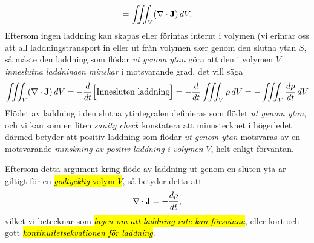 {{{$$   =\iiint_V (\nabla\cdot{\bf J})\,dV.
$$}
Eftersom ingen laddning kan skapas eller f{\"o}rintas internt i volymen (vi
erinrar oss att all laddnings\-transport in eller ut fr{\aa}n volymen sker
genom den slutna ytan $S$, s{\aa} m{\aa}ste den laddning som fl{\"o}dar
{\it ut genom ytan} g{\"o}ra att den i volymen $V$ {\it inneslutna laddningen
minskar} i motsvarande grad, det vill s{\"a}ga
\hl{$$
  \iiint_V (\nabla\cdot{\bf J})\,dV
    =-{{d}\over{dt}}\Big[\hbox{Innesluten laddning}\Big]
    =-{{d}\over{dt}}\iiint_V \rho\,dV
    =-\iiint_V {{d\rho}\over{dt}}\,dV
$$}
Fl{\"o}det av laddning i den slutna ytintegralen definieras som fl{\"o}det
{\it ut genom ytan}, och vi kan som en liten {\it sanity check} konstatera att
minustecknet i h{\"o}gerledet d{\"a}rmed betyder att positiv laddning som
fl{\"o}dar {\it ut genom ytan} motsvaras av en motsvarande {\it minskning av
positiv laddning i volymen} $V$, helt enligt f{\"o}rv{\"a}ntan.

Eftersom detta argument kring fl{\"o}de av laddning ut genom en sluten yta
{\"a}r giltigt f{\"o}r en {\hl{{\it godtycklig} volym $V$}}, s{\aa} betyder
detta att
\hl{$$
  \nabla\cdot{\bf J}=-{{d\rho}\over{dt}},
$$}
vilket vi betecknar
som {\hl{\it lagen om att laddning inte kan f{\"o}rsvinna}}, eller kort och
gott {\hl{\it kontinuitetsekvationen f{\"o}r laddning}}.

}}

